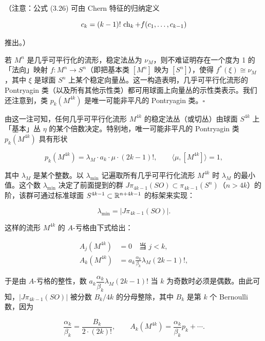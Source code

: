 （注意：公式 (3.26) 可由 Chern 特征的归纳定义

\[ c_k=(k-1)!\,\operatorname{ch}_k+f(c_1,\dots,c_{k-1}) \]

推出。）

\begin{remark}{}
若 $M^n$ 是几乎可平行化的流形，稳定法丛为 $\nu_M$，则不难证明存在一个度为 1 的「法向」映射 $f:M^n\to S^n$（即把基本类 $[M^n]$ 映为 $[S^n]$），使得 $f^*(\xi)\cong\nu_M$，其中 $\xi$ 是球面 $S^n$ 上某个稳定向量丛。这一构造表明，几乎可平行化流形的 Pontryagin 类（以及所有其他示性类）都可用球面上向量丛的示性类表示。我们还注意到，类 $p_k(M^{4k})$ 是唯一可能非平凡的 Pontryagin 类。\hfill$\square$
\end{remark}

由这一注可知，任何几乎可平行化流形 $M^{4k}$ 的稳定法丛（或切丛）由球面 $S^{4k}$ 上「基本」丛 $\eta$ 的某个倍数决定。特别地，唯一可能非平凡的 Pontryagin 类 $p_k(M^{4k})$ 具有形状

\[ p_k(M^{4k})=\lambda_M\cdot a_k\cdot\mu\cdot(2k-1)!,\qquad \langle\mu,[M^{4k}]\rangle=1, \]

其中 $\lambda_M$ 是某个整数。以 $\lambda_{\min}$ 记遍取所有几乎可平行化流形 $M^{4k}$ 时 $\lambda_M$ 的最小值。这个数 $\lambda_{\min}$ 决定了前面提到的群 $J\pi_{4k-1}(SO)\subset\pi_{4k-1}(S^n)$（$n>4k$）的阶，该群可通过标准球面 $S^{4k-1}\subset\mathbb{R}^{n+4k-1}$ 的标架来实现：

\begin{equation}
\lambda_{\min}=|J\pi_{4k-1}(SO)|. \tag{3.27}
\end{equation}


这样的流形 $M^{4k}$ 的 $A$-亏格由下式给出：

\begin{align}
A_j(M^{4k}) &= 0\quad \text{当 }j<k, \nonumber\\
A_k(M^{4k}) &= a_k\frac{\alpha_k}{\beta_k}\lambda_M(2k-1)!, \tag{3.28}
\end{align}

于是由 $A$-亏格的整性，数 $a_k\dfrac{\alpha_k}{\beta_k}\lambda_M(2k-1)!$ 当 $k$ 为奇数时必须是偶数。由此可知，$|J\pi_{4k-1}(SO)|$ 被分数 $B_k/4k$ 的分母整除，其中 $B_k$ 是第 $k$ 个 Bernoulli 数，因为

\[ \frac{\alpha_k}{\beta_k}=\frac{B_k}{2\cdot(2k)!},\qquad A_k(M^{4k})=\frac{\alpha_k}{\beta_k}p_k+\cdots. \]

